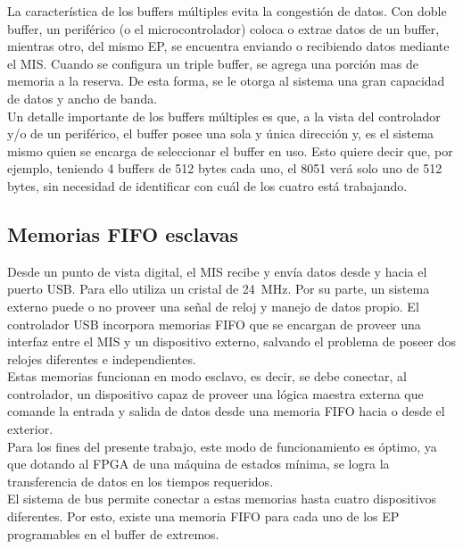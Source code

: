 	La característica de los buffers múltiples evita la congestión de datos. Con doble buffer, un periférico (o el microcontrolador) coloca o extrae datos de un buffer, mientras otro, del mismo EP, se encuentra enviando o recibiendo datos mediante el MIS. Cuando se configura un triple buffer, se agrega una porción mas de memoria a la reserva. De esta forma, se le otorga al sistema una gran capacidad de datos y ancho de banda.\\
	
	Un detalle importante de los buffers múltiples es que, a la vista del controlador y/o de un periférico, el buffer posee una sola y única dirección y, es el sistema mismo quien se encarga de seleccionar el buffer en uso. Esto quiere decir que, por ejemplo, teniendo 4 buffers de 512 bytes cada uno, el 8051 verá solo uno de 512 bytes, sin necesidad de identificar con cuál de los cuatro está trabajando.\\   

\subsection{Memorias FIFO esclavas}		

	Desde un punto de vista digital, el MIS recibe y envía datos desde y hacia el puerto USB. Para ello utiliza un cristal de \SI{24}{\mega\hertz}. Por su parte, un sistema externo puede o no proveer una señal de reloj y manejo de datos propio. El controlador USB incorpora memorias FIFO que se encargan de proveer una interfaz entre el MIS y un dispositivo externo, salvando el problema de poseer dos relojes diferentes e independientes.\\
	
	Estas memorias funcionan en modo esclavo, es decir, se debe conectar, al controlador, un dispositivo  capaz de proveer una lógica maestra externa que comande la entrada y salida de datos desde una memoria FIFO hacia o desde el exterior.\\
	
	Para los fines del presente trabajo, este modo de funcionamiento es óptimo, ya que dotando al FPGA de una máquina de estados mínima, se logra la transferencia de datos en los tiempos requeridos.\\
	
	El sistema de bus permite conectar a estas memorias hasta cuatro dispositivos diferentes. Por esto, existe una memoria FIFO para cada uno de los EP programables en el buffer de extremos.\\
	
